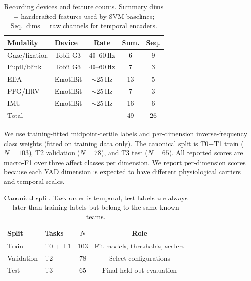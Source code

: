 \documentclass[sigconf,review,anonymous]{acmart}
\begin{document}
\begin{table}[t]
\caption{Recording devices and feature counts. Summary dims = handcrafted
features used by SVM baselines; Seq.\ dims = raw channels for temporal encoders.}
\label{tab:devices}
\centering
\setlength{\tabcolsep}{3pt}
\small
\begin{tabular}{lp{1.5cm}ccc}
\toprule
\textbf{Modality} & \textbf{Device} & \textbf{Rate} &
  \textbf{Sum.} & \textbf{Seq.} \\
\midrule
Gaze/fixation & Tobii G3 & 40--60\,Hz & 6  & 9 \\
Pupil/blink   & Tobii G3 & 40--60\,Hz & 7  & 3 \\
EDA           & EmotiBit & $\sim$25\,Hz & 13 & 5 \\
PPG/HRV       & EmotiBit & $\sim$25\,Hz & 7  & 3 \\
IMU           & EmotiBit & $\sim$25\,Hz & 16 & 6 \\
\midrule
Total         & --       & --          & 49 & 26 \\
\bottomrule
\end{tabular}
\end{table}

We use training-fitted midpoint-tertile labels and per-dimension
inverse-frequency class weights (fitted on training data only).
The canonical split is T0+T1 train ($N{=}103$), T2 validation ($N{=}78$),
and T3 test ($N{=}65$).
All reported scores are macro-F1 over three affect classes per dimension.
We report per-dimension scores because each VAD dimension is expected to have
different physiological carriers and temporal scales.

\begin{table}[t]
\caption{Canonical split. Task order is temporal; test labels are always later
than training labels but belong to the same known teams.}
\label{tab:split}
\centering
\setlength{\tabcolsep}{4pt}
\small
\begin{tabular}{llcc}
\toprule
\textbf{Split} & \textbf{Tasks} & \textbf{$N$} & \textbf{Role} \\
\midrule
Train      & T0 + T1 & 103 & Fit models, thresholds, scalers \\
Validation & T2      &  78 & Select configurations \\
Test       & T3      &  65 & Final held-out evaluation \\
\bottomrule
\end{tabular}
\end{table}
\end{document}
